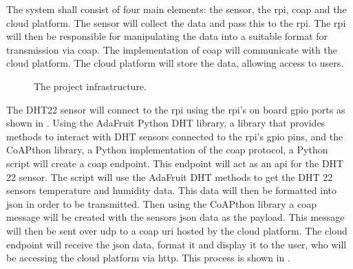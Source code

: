 The system shall consist of four main elements: the sensor, the \gls{rpi}, \gls{coap} and the cloud platform.
The sensor will collect the data and pass this to the \gls{rpi}. The \gls{rpi} will then be responsible for manipulating
the data into a suitable format for transmission via \gls{coap}. The implementation of \gls{coap} will communicate with
the cloud platform. The cloud platform will store the data, allowing access to users.

\begin{figure}[H]
    \centering
    \caption{\label{fig:proj_framework} The project infrastructure.}
\end{figure}


The DHT22 sensor will connect to the \gls{rpi} using the \gls{rpi}'s on board 
\gls{gpio} ports as shown in . 
Using the AdaFruit Python DHT library, a library that provides methods to interact 
with DHT sensors connected to the \gls{rpi}'s \gls{gpio} pins, 
and the CoAPthon library, a Python implementation of the \gls{coap} protocol, a 
Python script will create a \gls{coap} endpoint.
This endpoint will act as an \gls{api} for the DHT 22 sensor. 
The script will use the AdaFruit DHT methods to get the DHT 22 sensors temperature 
and humidity data. This data will then be formatted into \gls{json} in order to 
be transmitted. Then using the CoAPthon library a \gls{coap} message will be created 
with the sensors \gls{json} data as the payload. This message will then be sent over
\gls{udp} to a \gls{coap} \gls{uri} hosted by the cloud platform. The cloud endpoint 
will receive the \gls{json} data, format it and display it to the user, who will 
be accessing the cloud platform via \gls{http}. This process is shown in .

